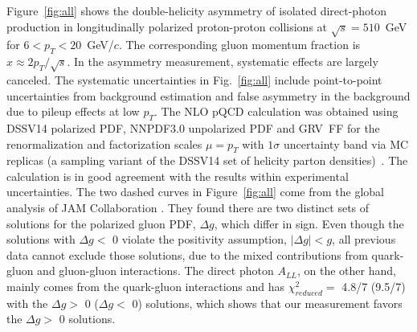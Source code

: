 \documentclass[twocolumn,letterpaper,aps,prl,longbibliography,superscriptaddress,floatfix]{revtex4-2}
\newcommand{\pT}{\mbox{$p_T$}\xspace}
\newcommand{\ALL}{\mbox{$A_{LL}$}\xspace}
\begin{document}
Figure~\ref{fig:all} shows the double-helicity asymmetry of isolated 
direct-photon production in longitudinally polarized proton-proton 
collisions at $\sqrt{s}=510$~GeV for $6<p_T<20$~GeV/$c$.
The corresponding gluon momentum fraction is $x \approx 2p_T/\sqrt{s}$.
In the asymmetry  measurement, systematic effects are largely canceled.
The systematic uncertainties in Fig.~\ref{fig:all} include point-to-point
uncertainties from background estimation and false asymmetry in the
background due to pileup effects at low \pT.
The NLO pQCD calculation was obtained using DSSV14 polarized PDF, NNPDF3.0 
unpolarized PDF and GRV~FF for the renormalization and factorization 
scales $\mu=p_T$ with $1\sigma$ uncertainty band via MC replicas (a 
sampling variant of the DSSV14 set of helicity parton 
densities)~\cite{PhysRevLett.101.072001,PhysRevLett.113.012001, 
PhysRevD.100.114027}. The calculation is in good agreement with the 
results within experimental uncertainties.
The two dashed curves in Figure~\ref{fig:all} come from the global analysis
of JAM Collaboration \cite{PhysRevD.105.074022}.
They found there are two distinct sets of solutions for the polarized gluon
PDF, $\Delta g$, which differ in sign.
Even though the solutions with $\Delta g <$ 0 violate the positivity assumption,
$|\Delta g| < g$, all previous data cannot exclude those solutions,
due to the mixed contributions from quark-gluon and gluon-gluon interactions.
The direct photon \ALL, on the other hand, mainly comes from the quark-gluon
interactions and has $\chi_{reduced}^2 =$ 4.8/7 (9.5/7) with the $\Delta g >$ 0
($\Delta g <$ 0) solutions, which shows that our measurement favors the
$\Delta g >$ 0 solutions.
\end{document}
